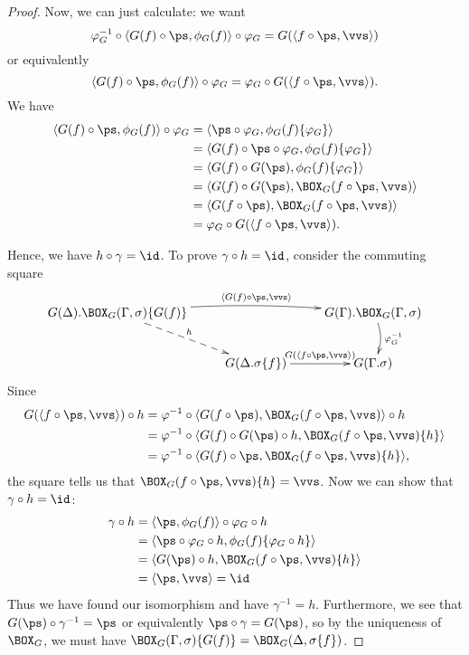 \documentclass{article}
\newcommand{\isoGL}{\ensuremath{\phi_{G}}}
\begin{document}
\begin{proof}
Now, we can just calculate: we want
\[
\varphi_G^{-1} \circ \langle G(f) \circ \ps, \isoGL(f)\rangle \circ \varphi_G = G(\langle f \circ \ps, \vvs\rangle)
\]
or equivalently
\[
\langle G(f) \circ \ps, \isoGL(f)\rangle \circ \varphi_G = \varphi_G \circ G(\langle f \circ \ps, \vvs\rangle).
\]
We have
\begin{align*}
  \langle G(f) \circ \ps, \isoGL(f)\rangle \circ \varphi_G &= \langle \ps \circ \varphi_G, \isoGL(f)\{\varphi_G\}\rangle \\
&= \langle G(f) \circ \ps \circ \varphi_G, \isoGL(f)\{\varphi_G\}\rangle \\
&= \langle G(f) \circ G(\ps), \isoGL(f)\{\varphi_G\}\rangle \\
&= \langle G(f) \circ G(\ps), \BOX_G(f \circ \ps, \vvs)\rangle \\
&= \langle G(f \circ \ps), \BOX_G(f \circ \ps, \vvs)\rangle \\
&=  \varphi_G \circ G(\langle f \circ \ps, \vvs\rangle).
\end{align*}

Hence, we have $h \circ \gamma = \id$. To prove $\gamma \circ h =
\id$, consider the commuting square 
\[
\xymatrix{
G(\Delta).\BOX_G(\Gamma, \sigma)\{G(f)\} \ar@/^/^-{\langle G(f) \circ \ps , \vvs\rangle}[rr] \ar@{-->}^{h}[dr] & & G(\Gamma).\BOX_G(\Gamma, \sigma) \ar@/^/^{\varphi_G^{-1}}[d]\\
& G(\Delta.\sigma\{f\}) \ar^-{G(\langle f \circ \ps, \vvs\rangle)}[r]  & G(\Gamma.\sigma) 
}
\]
Since
\begin{align*}
G(\langle f \circ \ps, \vvs\rangle) \circ h
 &= \varphi^{-1} \circ \langle G(f \circ \ps), \BOX_G(f \circ \ps, \vvs)\rangle \circ h\\
 &= \varphi^{-1} \circ \langle G(f) \circ G(\ps) \circ h, \BOX_G(f \circ \ps, \vvs)\{h\}\rangle \\
 &= \varphi^{-1} \circ \langle G(f) \circ \ps, \BOX_G(f \circ \ps, \vvs)\{h\}\rangle,
\end{align*}
the square tells us that $\BOX_G(f \circ \ps, \vvs)\{h\} = \vvs$. Now we can show that $\gamma \circ h = \id$:
\begin{align*}
  \gamma \circ h
 &= \langle \ps , \isoGL(f)\rangle \circ \varphi_G \circ h \\
 &= \langle \ps \circ \varphi_G \circ h , \isoGL(f)\{\varphi_G \circ h\}\rangle \\
 &= \langle G(\ps) \circ h , \BOX_G(f \circ \ps, \vvs)\{h\}\rangle \\
 &= \langle \ps , \vvs\rangle = \id
\end{align*}
Thus we have found our isomorphism and have $\gamma^{-1} =
h$. Furthermore, we see that $G(\ps) \circ \gamma^{-1} = \ps$ or
equivalently $\ps \circ \gamma = G(\ps)$, so by the uniqueness of
$\BOX_G$, we must have $\BOX_G(\Gamma, \sigma)\{G(f)\} =
\BOX_G(\Delta, \sigma\{f\})$.
\end{proof}



%
%
\end{document}

